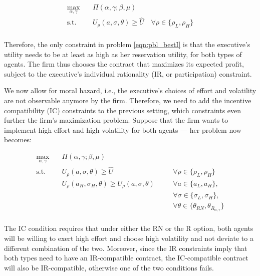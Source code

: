 \begin{equation}
    \label{eqn:pbl_bestI}
    \begin{aligned}
    \max_{\alpha, \gamma} \quad & \Pi (\alpha, \gamma; \beta, \mu) \\
    \textrm{s.t.}       \quad & U_\rho(a, \sigma, \theta) \ge \hat{U} \quad \forall \rho \in \{ \rho_L, \rho_H \}  \\
    \end{aligned}
\end{equation}

Therefore, the only constraint in problem \ref*{eqn:pbl_bestI} is that the executive's utility needs to be at least as high as her reservation utility, for both types of agents. The firm thus chooses the contract that maximizes its expected profit, subject to the executive's individual rationality (IR, or participation) constraint.

We now allow for moral hazard, i.e., the executive's choices of effort and volatility are not observable anymore by the firm. Therefore, we need to add the incentive compatibility (IC) constraints to the previous setting, which constraints even further the firm's maximization problem. Suppose that the firm wants to implement high effort and high volatility for both agents --- her problem now becomes:

\begin{equation}
    \label{eqn:pbl_bestII}
    \begin{alignedat}{2}
        \max_{\alpha, \gamma} \quad & \Pi (\alpha, \gamma; \beta, \mu) \\
        \textrm{s.t.}       \quad & U_\rho(a, \sigma, \theta) \ge \hat{U} & \quad & \forall \rho \in \{ \rho_L, \rho_H \} \\
                            \quad & U_\rho(a_H, \sigma_H, \theta) \ge U_\rho(a, \sigma, \theta) & & \forall a \in \{ a_L, a_H \}, \\
                            \quad & & & \forall \sigma \in \{ \sigma_L, \sigma_H \}, \\
                            \quad & & & \forall \theta \in \{ \theta_{RN}, \theta_{R_{\alpha, \gamma}} \} \\ 
    \end{alignedat}
\end{equation}

The IC condition requires that under either the RN or the R option, both agents will be willing to exert high effort and choose high volatility and not deviate to a different combination of the two. Moreover, since the IR constraints imply that both types need to have an IR-compatible contract, the IC-compatible contract will also be IR-compatible, otherwise one of the two conditions fails.


